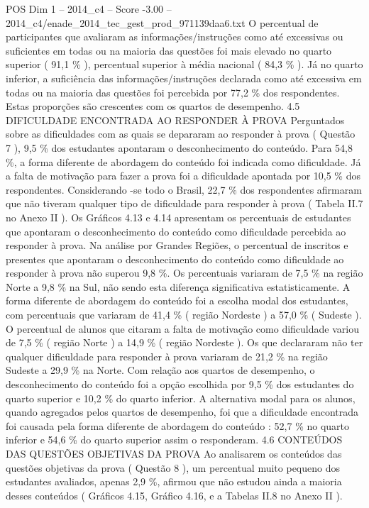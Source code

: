 \begin{textsample}{POS Dim 1 – 2014\_c4 – Score -3.00 – 2014\_c4/enade\_2014\_tec\_gest\_prod\_971139daa6.txt}
O percentual de participantes que avaliaram as informações/instruções como até excessivas ou suficientes em todas ou na maioria das questões foi mais elevado no quarto superior ( 91,1 \% ), percentual superior à média nacional ( 84,3 \% ).
Já no quarto inferior, a suficiência das informações/instruções declarada como até excessiva em todas ou na maioria das questões foi percebida por 77,2 \% dos respondentes.
Estas proporções são crescentes com os quartos de desempenho. 4.5 DIFICULDADE ENCONTRADA AO RESPONDER À PROVA Perguntados sobre as dificuldades com as quais se depararam ao responder à prova ( Questão 7 ), 9,5 \% dos estudantes apontaram o desconhecimento do conteúdo.
Para 54,8 \%, a forma diferente de abordagem do conteúdo foi indicada como dificuldade.
Já a falta de motivação para fazer a prova foi a dificuldade apontada por 10,5 \% dos respondentes.
Considerando -se todo o Brasil, 22,7 \% dos respondentes afirmaram que não tiveram qualquer tipo de dificuldade para responder à prova ( Tabela II.7 no Anexo II ).
Os Gráficos 4.13 e 4.14 apresentam os percentuais de estudantes que apontaram o desconhecimento do conteúdo como dificuldade percebida ao responder à prova.
Na análise por Grandes Regiões, o percentual de inscritos e presentes que apontaram o desconhecimento do conteúdo como dificuldade ao responder à prova não superou 9,8 \%.
Os percentuais variaram de 7,5 \% na região Norte a 9,8 \% na Sul, não sendo esta diferença significativa estatisticamente.
A forma diferente de abordagem do conteúdo foi a escolha modal dos estudantes, com percentuais que variaram de 41,4 \% ( região Nordeste ) a 57,0 \% ( Sudeste ).
O percentual de alunos que citaram a falta de motivação como dificuldade variou de 7,5 \% ( região Norte ) a 14,9 \% ( região Nordeste ).
Os que declararam não ter qualquer dificuldade para responder à prova variaram de 21,2 \% na região Sudeste a 29,9 \% na Norte.
Com relação aos quartos de desempenho, o desconhecimento do conteúdo foi a opção escolhida por 9,5 \% dos estudantes do quarto superior e 10,2 \% do quarto inferior.
A alternativa modal para os alunos, quando agregados pelos quartos de desempenho, foi que a dificuldade encontrada foi causada pela forma diferente de abordagem do conteúdo : 52,7 \% no quarto inferior e 54,6 \% do quarto superior assim o responderam. 4.6 CONTEÚDOS DAS QUESTÕES OBJETIVAS DA PROVA Ao analisarem os conteúdos das questões objetivas da prova ( Questão 8 ), um percentual muito pequeno dos estudantes avaliados, apenas 2,9 \%, afirmou que não estudou ainda a maioria desses conteúdos ( Gráficos 4.15, Gráfico 4.16, e a Tabelas II.8 no Anexo II ).

\end{textsample}
